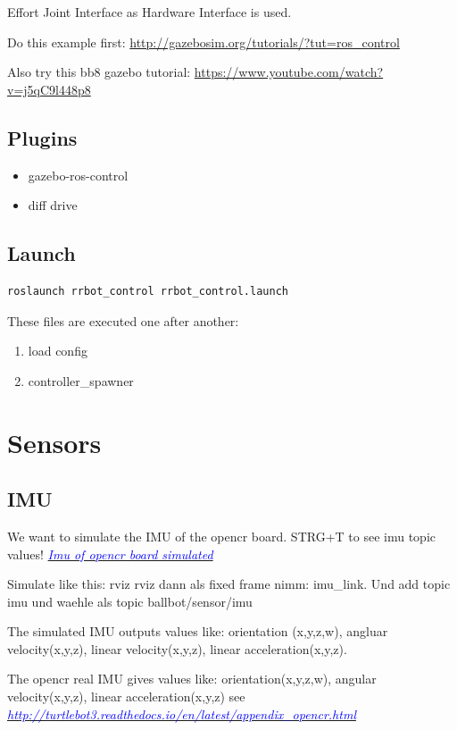 \documentclass[twoside,colorback,accentcolor=tud4c,11pt]{tudreport}
\newcommand{\mylink}[2] {	\hyperlink{#1}{	\textit{\textcolor{blue}{#2}}}}
\begin{document}
	Effort Joint Interface as Hardware Interface is used.
	
	Do this example first: \url{http://gazebosim.org/tutorials/?tut=ros_control}
	
	Also try this bb8 gazebo tutorial: \url{https://www.youtube.com/watch?v=j5qC9l448p8}
	
	\subsection{Plugins}
	\begin{itemize}
		\item gazebo-ros-control
		\item diff drive
	\end{itemize}
	
	\subsection{Launch}
	\begin{lstlisting}[style=BashInputStyle]
	roslaunch rrbot_control rrbot_control.launch
	\end{lstlisting}
	
	These files are executed one after another:
	\begin{enumerate}
		\item load config
		\item controller\_spawner
	\end{enumerate}
	
	\section{Sensors}
	\subsection{IMU}
	
		We want to simulate the IMU of the opencr board. STRG+T to see imu topic values!
	\mylink{https://www.youtube.com/watch?v=wXN_7oRHst0}{Imu of opencr board simulated}

	Simulate like this:
	rviz rviz dann als fixed frame nimm: imu\_link. Und add topic imu und waehle als topic ballbot/sensor/imu
	
	The simulated IMU outputs values like: orientation (x,y,z,w), angluar velocity(x,y,z), linear velocity(x,y,z), linear acceleration(x,y,z).
	
	The opencr real IMU gives values like: orientation(x,y,z,w), angular velocity(x,y,z), linear acceleration(x,y,z) see \mylink{OpenCR board IMU }{http://turtlebot3.readthedocs.io/en/latest/appendix\_opencr.html}
	
\end{document}
